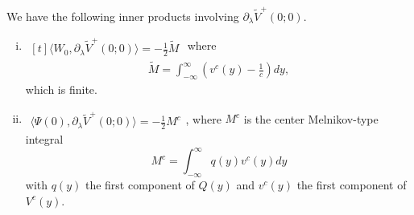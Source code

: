 \documentclass[thesis.tex]{subfiles}
\begin{document}
\begin{lemma}\label{lemma:VderivIPs}
We have the following inner products involving $\partial_\lambda \tilde{V}^+(0; 0)$. 
\begin{enumerate}[(i)]
\item
$
\begin{aligned}[t]
\langle W_0, \partial_\lambda \tilde{V}^+(0; 0) \rangle
= -\frac{1}{2} \tilde{M}
\end{aligned}
$
where
\begin{align}\label{defMtilde}
\tilde{M} = \int_{-\infty}^{\infty} \left(v^c(y) - \frac{1}{c}\right) dy,
\end{align}
which is finite.
\item 
$
\begin{aligned}
\langle \Psi(0), \partial_\lambda \tilde{V}^+(0; 0) \rangle = -\frac{1}{2} M^c
\end{aligned}
$,
where $M^c$ is the center Melnikov-type integral
\begin{equation}\label{defMc}
M^c = \int_{-\infty}^\infty q(y) v^c(y) dy
\end{equation}
with $q(y)$ the first component of $Q(y)$ and $v^c(y)$ the first component of $V^c(y)$.


\end{enumerate}
\end{lemma}
\end{document}
